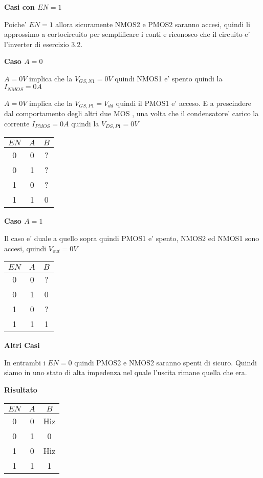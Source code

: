 \documentclass[\main/main.tex]{subfiles}
\begin{document}
\textbf{Casi con $EN = 1$}

Poiche' $EN = 1$ allora sicuramente NMOS2 e PMOS2 saranno accesi, quindi li approssimo a cortocircuito per semplificare i conti e riconosco che il circuito e' l'inverter di esercizio 3.2.

\textbf{Caso $A = 0$}

$A = 0V$ implica che la $V_{GS,N1} = 0V$ quindi NMOS1 e' spento quindi la $I_{NMOS}  = 0A$

$A = 0V$ implica che la $V_{GS,P1} = V_{dd}$ quindi il PMOS1 e' acceso.
E a prescindere dal comportamento degli altri due MOS , una volta che il condensatore' carico la corrente $I_{PMOS} = 0A$ quindi la $V_{DS,P1} = 0V$
\begin{center}
	\begin{tabular}{ c  c | c}
		$EN$ & $A$ & $B$ \\
		\hline
		0    & 0   & ?   \\
		0    & 1   & ?   \\
		1    & 0   & ?   \\
		1    & 1   & 0   \\
	\end{tabular}
\end{center}

\textbf{Caso  $A = 1$}

Il caso e' duale a quello sopra quindi PMOS1 e' spento, NMOS2 ed NMOS1 sono accesi, quindi $V_{out} = 0V$

\begin{center}
	\begin{tabular}{ c  c | c}
		$EN$ & $A$ & $B$ \\
		\hline
		0    & 0   & ?   \\
		0    & 1   & 0   \\
		1    & 0   & ?   \\
		1    & 1   & 1   \\
	\end{tabular}
\end{center}

\textbf{Altri Casi}

In entrambi i $EN = 0$ quindi PMOS2 e NMOS2 saranno spenti di sicuro.
Quindi siamo in uno stato di alta impedenza nel quale l'uscita rimane quella che era.

\textbf{Risultato}
\begin{center}
	\begin{tabular}{ c  c | c}
		$EN$ & $A$ & $B$ \\
		\hline
		0    & 0   & Hiz \\
		0    & 1   & 0   \\
		1    & 0   & Hiz \\
		1    & 1   & 1   \\
	\end{tabular}
\end{center}
\end{document}
